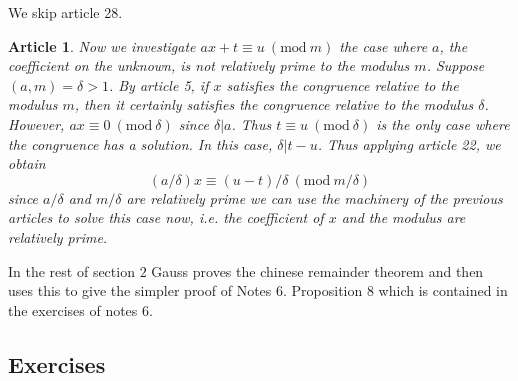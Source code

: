 \documentclass{article}
\theoremstyle{problemstyle}
\newtheorem{article}{Article}
\newcommand{\Mod}[1]{\ (\mathrm{mod}\ #1)}
\begin{document}
We skip article 28. 

\setcounter{article}{28}

\begin{article}
Now we investigate $ax + t \equiv u \Mod{m}$ the case where $a$, the coefficient on the unknown, is not relatively prime to the modulus $m$. Suppose $(a,m) = \delta > 1$. By article 5, if $x$ satisfies the congruence relative to the modulus $m$, then it certainly satisfies the congruence relative to the modulus $\delta$. However, $ax \equiv 0 \Mod{\delta}$ since $\delta|a$. Thus $t \equiv u \Mod{\delta}$ is the only case where the congruence has a solution. In this case, $\delta|t - u$. Thus applying article 22, we obtain $$(a/\delta)x  \equiv (u-t)/\delta \Mod{m/\delta}$$ since $a/\delta$ and $m/\delta$ are relatively prime we can use the machinery of the previous articles to solve this case now, i.e. the coefficient of $x$ and the modulus are relatively prime. 
\end{article}

In the rest of section $2$ Gauss proves the chinese remainder theorem and then uses this to give the simpler proof of Notes 6. Proposition 8 which is contained in the exercises of notes 6. 


\subsection*{Exercises}
\end{document}
